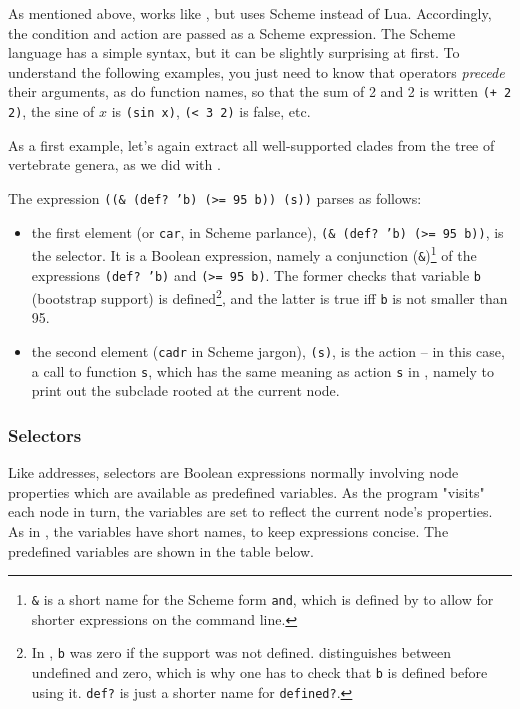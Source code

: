 \noindent{}As mentioned above, \sched{} works like \luaed{}, but uses Scheme
instead of Lua. Accordingly, the condition and action are passed as a Scheme
expression. The Scheme language has a simple syntax, but it can
be slightly surprising at first. To understand the following examples, you just
need to know that operators \emph{precede} their arguments, as do function
names, so that the sum of 2 and 2 is written \texttt{(+ 2 2)}, the sine of $x$
is \texttt{(sin x)}, \texttt{(< 3 2)} is false, etc.

\noindent{}As a first example, let's again extract all
well-supported clades from the tree of vertebrate genera, as we did with \luaed.


\begin{samepage}

\end{samepage}

The expression \texttt{((\& (def? 'b) (>= 95 b)) (s))} parses as follows:
\begin{itemize}
	\item the first element (or \texttt{car}, in Scheme parlance),
	\texttt{(\& (def? 'b) (>= 95 b))}, is the selector.  It is a Boolean
	expression, namely a conjunction (\texttt{\&})\footnote{\texttt{\&} is
	a short name for the Scheme form \texttt{and}, which is defined by
	\sched{} to allow for shorter expressions on the command line.} of the
	expressions \texttt{(def? 'b)} and \texttt{(>= 95 b)}.  The former
	checks that variable \texttt{b} (bootstrap support) is
	defined\footnote{In \ed, \texttt{b} was zero if the support was not
	defined. \sched{} distinguishes between undefined and zero, which is
	why one has to check that \texttt{b} is defined before using it.
	\texttt{def?} is just a shorter name for \texttt{defined?}.}, and the
	latter is true iff \texttt{b} is not smaller than 95.
	\item the second element (\texttt{cadr} in Scheme jargon),
	\texttt{(s)}, is the action -- in this case, a call to function
	\texttt{s}, which has the same meaning as action \texttt{s} in \ed,
	namely to print out the subclade rooted at the current node.
\end{itemize}

\subsubsection{Selectors}

Like \ed{} addresses, \sched{} selectors are Boolean expressions normally
involving node properties which are available as predefined variables. As the
program "visits" each node in turn, the variables are set to reflect the current
node's properties. As in \ed{}, the variables have short names, to keep
expressions concise. The predefined variables are shown in the table below.

